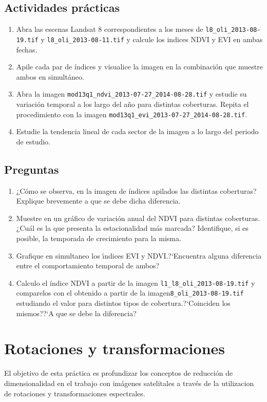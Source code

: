 \documentclass[hidelinks,12pt]{article}
\begin{document}
\subsection{Actividades pr\'acticas}
\begin{enumerate}
    \item Abra las escenas Landsat 8 correspondientes a los meses de
        \texttt{l8\_oli\_2013-08-19.tif} y \texttt{l8\_oli\_2013-08-11.tif} y
        calcule los indices NDVI y EVI en ambas fechas.
    \item Apile cada par de  índices y visualice la imagen en la combinación que 
        muestre ambos en simultáneo.
    \item Abra la imagen \texttt{mod13q1\_ndvi\_2013-07-27\_2014-08-28.tif} y 
        estudie su variaci\'on temporal a los largo del a\~no para distintas 
        coberturas. Repita el procedimiento con la imagen 
        \texttt{mod13q1\_evi\_2013-07-27\_2014-08-28.tif}.
    \item Estudie la tendencia lineal de cada sector de la imagen a lo largo del
        periodo de estudio.
\end{enumerate}

\subsection{Preguntas}
\begin{enumerate}
    \item ¿Cómo se observa, en la imagen de índices apilados las distintas
        coberturas? Explique brevemente a que se debe dicha diferencia.
    \item Muestre en un gráfico de variación anual del NDVI para distintas coberturas.
        ¿Cuál es la que presenta la estacionalidad más marcada? Identifique, si es
        posible, la temporada de crecimiento para la misma.
    \item Grafique en simultaneo los \'{\i}ndices EVI y NDVI.?`Encuentra alguna
        diferencia entre el comportamiento temporal de ambos? 
    \item Calculo el \'indice NDVI a partir de la imagen \texttt{l1\_l8\_oli\_2013-08-19.tif}
        y comparelos con el obtenido a partir de la
        imagen\texttt{8\_oli\_2013-08-19.tif} estudiando el valor para distintos
        tipos de cobertura.?`Coinciden los mismos??`A que se debe la
        diferencia?
\end{enumerate}
\newpage
\section{Rotaciones y transformaciones}
El objetivo de esta práctica es  profundizar los conceptos de reducción
de dimensionalidad en el trabajo con imágenes satelitales a través de la
utilizacion de rotaciones y transformaciones espectrales.
\end{document}
